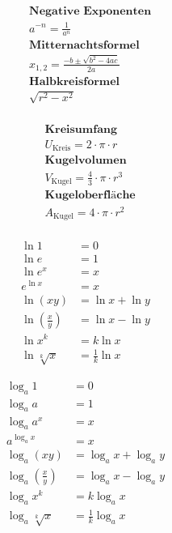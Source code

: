 \documentclass[11pt, openany]{book}
\begin{document}
\begin{center}
\begin{tcolorbox}
\begin{minipage}[t]{0.5\textwidth}
\begin{align*}
    &\textbf{Negative Exponenten} \\
    & a^{-n} = \frac{1}{a^n} \\
    &\textbf{Mitternachtsformel} \\
    & x_{1,2} = \frac{-b \pm \sqrt{b^2 - 4ac}}{2a} \\
    &\textbf{Halbkreisformel} \\
    & \sqrt{r^2 - x^2} \\
\end{align*}
\end{minipage}%
\begin{minipage}[t]{0.5\textwidth}
\begin{align*}
    &\textbf{Kreisumfang} \\
    & U_\text{Kreis} = 2 \cdot \pi \cdot r \\
    &\textbf{Kugelvolumen} \\
    & V_\text{Kugel} = \frac{4}{3} \cdot \pi \cdot r^3 \\
    &\textbf{Kugeloberfläche} \\
    & A_\text{Kugel} = 4 \cdot \pi \cdot r^2 \\
\end{align*}
\end{minipage}    
\end{tcolorbox}

\end{center}

\begin{minipage}{0.45\textwidth}
\begin{align*}
    \ln{1} &= 0 \\
    \ln{e} &= 1 \\
    \ln{e^x} &= x \\
    e^{\ln{x}} &= x \\
    \ln{(xy)} &= \ln{x} + \ln{y} \\
    \ln{\left(\frac{x}{y}\right)} &= \ln{x} - \ln{y} \\
    \ln{x^k} &= k\ln{x} \\
    \ln{\sqrt[k]{x}} &= \frac{1}{k}\ln{x}
\end{align*}
\end{minipage}
\hfill
\begin{minipage}{0.45\textwidth}
\begin{align*}
    \log_a{1} &= 0 \\
    \log_a{a} &= 1 \\
    \log_a{a^x} &= x \\
    a^{\log_a{x}} &= x \\
    \log_a{(xy)} &= \log_a{x} + \log_a{y} \\
    \log_a{\left(\frac{x}{y}\right)} &= \log_a{x} - \log_a{y} \\
    \log_a{x^k} &= k\log_a{x} \\
    \log_a{\sqrt[k]{x}} &= \frac{1}{k}\log_a{x}
\end{align*}
\end{minipage}
\end{document}
